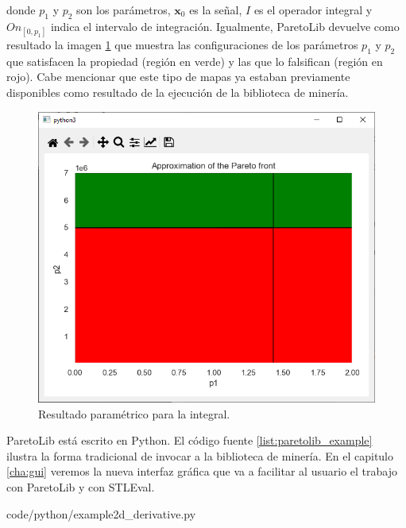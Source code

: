 donde $p_1$ y $p_2$ son los parámetros, $\mathbf{x}_0$ es la señal, $I$ es el operador integral y $On_{[0,p_1]}$ indica el intervalo de integración.
Igualmente, ParetoLib devuelve como resultado la imagen \ref{fig:param_integral} que muestra las configuraciones de los parámetros $p_1$ y $p_2$ que satisfacen la propiedad (región en verde) y las que lo falsifican (región en rojo). 
Cabe mencionar que este tipo de mapas ya estaban previamente disponibles como resultado de la ejecución de la biblioteca de minería.

\begin{figure}[htb]
\centering
  \includegraphics[width=0.7\linewidth]{images/stl_parametrico_int} 
\caption{Resultado paramétrico para la integral.}
\label{fig:param_integral}
\end{figure}

ParetoLib está escrito en Python. El código fuente \ref{list:paretolib_example} ilustra la forma tradicional de invocar a la biblioteca de minería. En el capitulo \ref{cha:gui} veremos la nueva interfaz gráfica que va a facilitar al usuario el trabajo con ParetoLib y con STLEval.



		{code/python/example2d_derivative.py}
